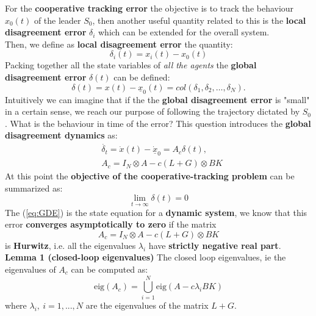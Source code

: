 For the \textbf{cooperative tracking error} the objective is to track the behaviour $x_0(t)$ of the leader $S_0$, then another useful quantity related to this is the \textbf{local disagreement error} $\delta_i$ which can be extended for the overall system.\\
Then, we define as \textbf{local disagreement error} the quantity: 
\begin{equation}
    \delta_i(t) = x_i(t) - {x}_0(t)
\end{equation}
Packing together all the state variables of \textit{all the agents} the \textbf{global disagreement error} $\delta(t)$ can be defined: 
\begin{equation}
    \delta(t) = x(t)-\underline{x}_0(t)=col(\delta_1, \delta_2, \dots, \delta_N).
\end{equation}
Intuitively we can imagine that if the the \textbf{global disagreement error} is "small" in a certain sense, we reach our purpose of following the trajectory dictated by $S_0$. What is the behaviour in time of the error? This question introduces the \textbf{global disagreement dynamics} as:
\begin{align}
    &\dot{\delta_t} = \dot{x}(t) - \dot{\underline{x}}_0 = A_c \delta(t), \label{eq:GDE} \\
    &A_c = I_N \otimes A - c(L+G)\otimes BK
\end{align}
At this point the \textbf{objective of the cooperative-tracking problem} can be summarized as:
{\large{
    \begin{equation}
        \lim_{t\to\infty}  \delta(t) = 0
    \end{equation}
}}
The (\ref{eq:GDE}) is the state equation for a \textbf{dynamic system}, we know that this error \textbf{converges asymptotically to zero} if the matrix
\begin{equation*}
    A_c = I_N \otimes A - c(L+G)\otimes BK
\end{equation*}
is \textbf{Hurwitz}, i.e. all the eigenvalues $\lambda_i$ have \textbf{strictly negative real part}.\\

\noindent
\textbf{Lemma 1 (closed-loop eigenvalues)} The closed loop eigenvalues, ie the eigenvalues of $A_c$ can be computed as:
\begin{equation}
    \text{eig}(A_c) = \bigcup_{i=1}^N \text{eig}(A-c \lambda_iBK)
\end{equation}  
where $\lambda_i, \ i=1,..., N$ are the eigenvalues of the matrix $L+G$.

